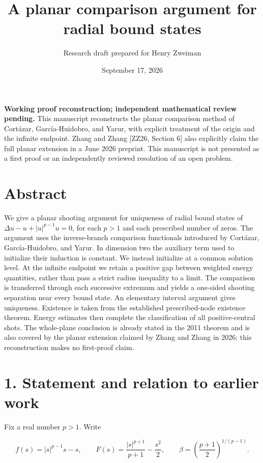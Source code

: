 \documentclass[11pt]{article}
\title{A planar comparison argument for radial bound states}
\author{Research draft prepared for Henry Zweiman}
\date{September 17, 2026}
\begin{document}
\maketitle
\textbf{Working proof reconstruction; independent mathematical review
pending.} This manuscript reconstructs the planar comparison method of
Cortázar, García-Huidobro, and Yarur, with explicit treatment of the
origin and the infinite endpoint. Zhang and Zhang {[}ZZ26, Section 6{]}
also explicitly claim the full planar extension in a June 2026 preprint.
This manuscript is not presented as a first proof or an independently
reviewed resolution of an open problem.

\section{Abstract}\label{abstract}

We give a planar shooting argument for uniqueness of radial bound states
of \(\Delta u-u+|u|^{p-1}u=0\), for each \(p>1\) and each prescribed
number of zeros. The argument uses the inverse-branch comparison
functionals introduced by Cortázar, García-Huidobro, and Yarur. In
dimension two the auxiliary term used to initialize their induction is
constant. We instead initialize at a common solution level. At the
infinite endpoint we retain a positive gap between weighted energy
quantities, rather than pass a strict radius inequality to a limit. The
comparison is transferred through each successive extremum and yields a
one-sided shooting separation near every bound state. An elementary
interval argument gives uniqueness. Existence is taken from the
established prescribed-node existence theorem. Energy estimates then
complete the classification of all positive-central shots. The
whole-plane conclusion is already stated in the 2011 theorem and is also
covered by the planar extension claimed by Zhang and Zhang in 2026; this
reconstruction makes no first-proof claim.

\section{1. Statement and relation to earlier
work}\label{statement-and-relation-to-earlier-work}

Fix a real number \(p>1\). Write

\[
f(s)=|s|^{p-1}s-s,\qquad
F(s)=\frac{|s|^{p+1}}{p+1}-\frac{s^2}{2},\qquad
\beta=\left(\frac{p+1}{2}\right)^{1/(p-1)}.
\]
\end{document}

